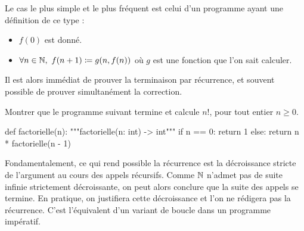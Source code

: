\documentclass{magnolia}
\begin{document}
Le cas le plus simple et le plus fréquent est celui d'un programme ayant
une définition de ce type :
\begin{itemize}
  \item $f(0)$ est donné.
  \item $\forall n \in \mathbb{N}, \ f(n+1)\coloneqq g(n,f(n))$ où $g$ est une fonction
  que l'on sait calculer.
\end{itemize}
Il est alors immédiat de prouver la terminaison par récurrence, et souvent
possible de prouver simultanément la correction.
\vspace{2ex}
\begin{exoUnique}
  \exo
  Montrer que le programme suivant termine et calcule $n!$, pour tout
  entier $n \geq 0$.
\begin{pythoncodeline}
def factorielle(n):
    """factorielle(n: int) -> int"""
    if n == 0:
        return 1
    else:
        return n * factorielle(n - 1)
\end{pythoncodeline}
\end{exoUnique}

Fondamentalement, ce qui rend possible la récurrence est la décroissance
stricte de l'argument au cours des appels récursifs.
Comme $\mathbb{N}$ n'admet pas de suite infinie strictement décroissante,
on peut alors conclure que la suite des appels se termine. En pratique,
on justifiera cette décroissance et l'on ne rédigera pas la récurrence.
C'est l'équivalent d'un variant de boucle
dans un programme impératif.\\
\end{document}
